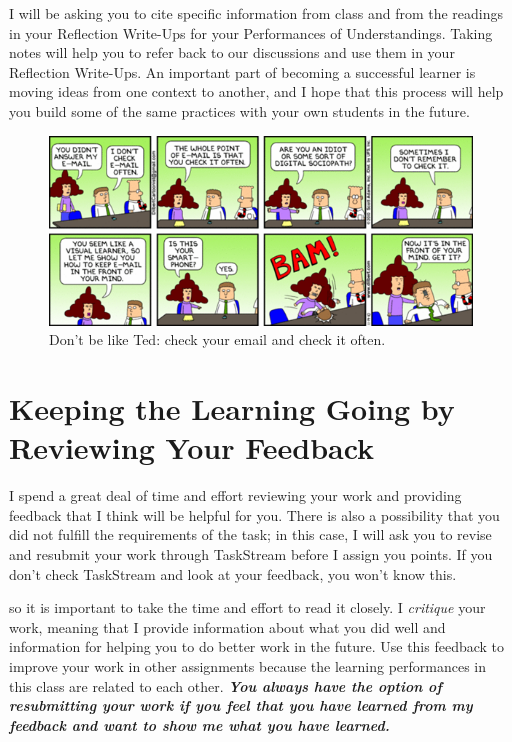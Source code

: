 \documentclass{tufte-handout}
\begin{document}
 I will be asking you to cite specific information from class and from the readings in your \textsf{Reflection Write-Ups} for your \textsf{Performances of Understandings}. Taking notes will help you to refer back to our discussions and use them in your \textsf{Reflection Write-Ups}. An important part of becoming a successful learner is moving ideas from one context to another, and I hope that this process will help you build some of the same practices with your own students in the future.



\begin{figure}%
  \includegraphics[width=\linewidth]{dilbert-email.png}
  \caption{Don't be like Ted: check your email and check it often.}
  \label{fig:dilbert-email}
\end{figure}



\section{Keeping the Learning Going by Reviewing Your Feedback}
I spend a great deal of time and effort reviewing your work and providing feedback that I think will be helpful for you. There is also a possibility that you did not fulfill the requirements of the task; in this case, I will ask you to revise and resubmit your work through TaskStream before I assign you points. If you don't check TaskStream and look at your feedback, you won't know this.

 so it is important to take the time and effort to read it closely. I \emph{critique} your work, meaning that I provide information about what you did well and information for helping you to do better work in the future. Use this feedback to improve your work in other assignments because the learning performances in this class are related to each other. \textbf{\emph{You always have the option of resubmitting your work if you feel that you have learned from my feedback and want to show me what you have learned.}}
\end{document}
